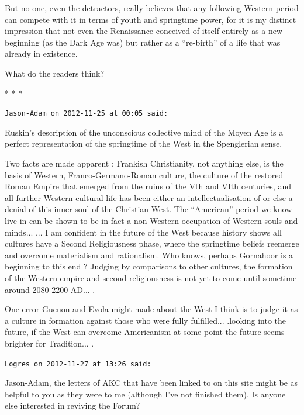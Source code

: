 But no one, even the detractors, really believes that any following Western period can compete with it in terms of youth and springtime power, for it is my distinct impression that not even the Renaissance conceived of itself entirely as a new beginning (as the Dark Age was) but rather as a ``re-birth'' of a life that was already in existence.

What do the readers think?



\begin{center}* * *\end{center}

\begin{footnotesize}
\begin{sffamily}
\texttt{Jason-Adam on 2012-11-25 at 00:05 said:}

Ruskin's description of the unconscious collective mind of the Moyen Age is a perfect representation of the springtime of the West in the Spenglerian sense.

Two facts are made apparent : Frankish Christianity, not anything else, is the basis of Western, Franco-Germano-Roman culture, the culture of the restored Roman Empire that emerged from the ruins of the Vth and VIth centuries, and all further Western cultural life has been either an intellectualisation of or else a denial of this inner soul of the Christian West. The ``American'' period we know live in can be shown to be in fact a non-Western occupation of Western souls and minds... ... I am confident in the future of the West because history shows all cultures have a Second Religiousness phase, where the springtime beliefs reemerge and overcome materialism and rationalism. Who knows, perhaps Gornahoor is a beginning to this end ? Judging by comparisons to other cultures, the formation of the Western empire and second religiousness is not yet to come until sometime around 2080-2200 AD... .

One error Guenon and Evola might made about the West I think is to judge it as a culture in formation against those who were fully fulfilled... .looking into the future, if the West can overcome Americanism at some point the future seems brighter for Tradition... .

\hfill

\texttt{Logres on 2012-11-27 at 13:26 said:}

Jason-Adam, the letters of AKC that have been linked to on this site might be as helpful to you as they were to me (although I've not finished them). Is anyone else interested in reviving the Forum?


\end{sffamily}
\end{footnotesize}

